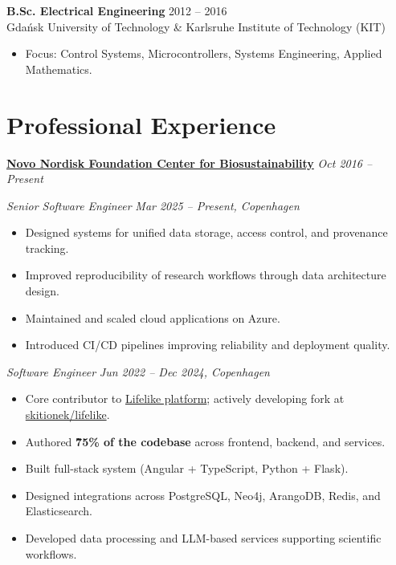 \documentclass[11pt,a4paper]{article}
\begin{document}
\textbf{B.Sc. Electrical Engineering} \hfill 2012 -- 2016 \\
Gdańsk University of Technology \& Karlsruhe Institute of Technology (KIT)
\begin{itemize}
    \small \item Focus: Control Systems, Microcontrollers, Systems Engineering, Applied Mathematics.
\end{itemize}

\section*{Professional Experience}

\textbf{\href{https://www.biosustain.dtu.dk/}{Novo Nordisk Foundation Center for Biosustainability}} \hfill \textit{Oct 2016 -- Present}

\vspace{4pt}

\textit{Senior Software Engineer} \hfill \textit{Mar 2025 -- Present, Copenhagen}
\begin{itemize}
    \item Designed systems for unified data storage, access control, and provenance tracking.
    \item Improved reproducibility of research workflows through data architecture design.
    \item Maintained and scaled cloud applications on Azure.
    \item Introduced CI/CD pipelines improving reliability and deployment quality.
\end{itemize}

\vspace{4pt}

\textit{Software Engineer} \hfill \textit{Jun 2022 -- Dec 2024, Copenhagen}
\begin{itemize}
    \item Core contributor to \href{https://lifelike.bio}{Lifelike platform}; actively developing fork at \href{https://github.com/skitionek/lifelike}{skitionek/lifelike}.
    \item Authored \textbf{\~75\% of the codebase} across frontend, backend, and services.
    \item Built full-stack system (Angular + TypeScript, Python + Flask).
    \item Designed integrations across PostgreSQL, Neo4j, ArangoDB, Redis, and Elasticsearch.
    \item Developed data processing and LLM-based services supporting scientific workflows.
\end{itemize}
\end{document}

